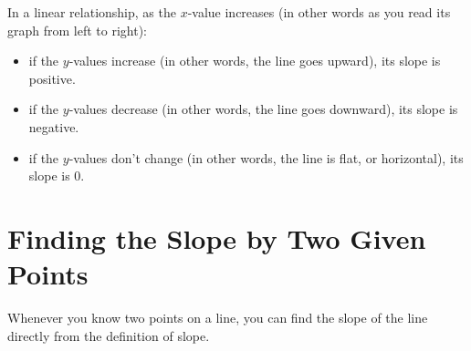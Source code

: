\documentclass{ximera}
\begin{document}
In a linear relationship, as the $x$-value increases (in other words as you read its graph from left to right):
\begin{itemize}
\item if the $y$-values increase (in other words, the line goes upward), its slope is positive. \\
\item if the $y$-values decrease (in other words, the line goes downward), its slope is negative. \\
\item if the $y$-values don't change (in other words, the line is flat, or horizontal), its slope is 0. \\
\end{itemize}


\section{Finding the Slope by Two Given Points}
Whenever you know two points on a line, you can find the slope of the line directly from the definition of slope.
\end{document}
